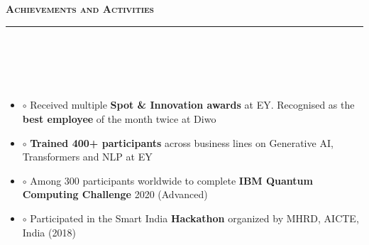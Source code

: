 \documentclass[a4paper,10pt]{article}
\newcommand{\lsep}{-0.5cm}
\newcommand{\resheading}[1]{{\small
        {
            \begin{minipage}
                {0.992\textwidth}\textbf{{\textsc{#1 \vphantom{p\^{E}} }}}
                \\[-0.3cm]
                \hrule
            \end{minipage}
            \\[-0.5cm]
        }
 }}
\begin{document}
\vspace{4pt}
\noindent
\resheading{\textbf{\large Achievements and Activities}}\\[\lsep] 
\\[-0.2cm]
\begin{itemize}

\item[] $\circ$  \hspace{0.0cm} Received multiple \textbf{Spot \& Innovation awards} at EY. Recognised as the \textbf{best employee} of the month twice at Diwo \\[-0.55cm]

\item[] $\circ$  \hspace{0.0cm} \textbf{Trained 400+ participants} across business lines on Generative AI, Transformers and NLP at EY  \\[-0.55cm]

\item[] $\circ$  \hspace{0.0cm} Among 300 participants worldwide to complete \textbf{IBM Quantum Computing Challenge} 2020 (Advanced) \\[-0.55cm]

\item[] $\circ$  \hspace{0.0cm} Participated in the Smart India \textbf{Hackathon} organized by MHRD, AICTE, India (2018) \\[-0.55cm]





\end{itemize}
\end{document}
